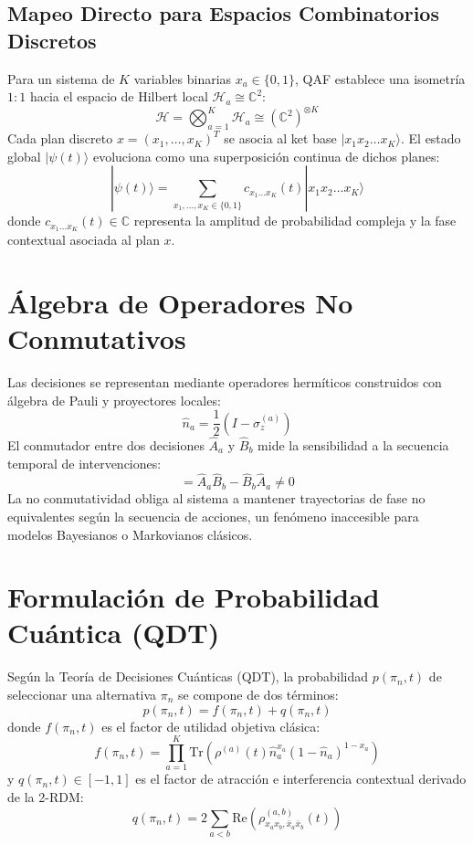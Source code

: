 \documentclass[11pt,a4paper,oneside]{report}
\begin{document}
\subsection{Mapeo Directo para Espacios Combinatorios Discretos}
Para un sistema de $K$ variables binarias $x_a \in \{0, 1\}$, QAF establece una isometría $1:1$ hacia el espacio de Hilbert local $\mathcal{H}_a \cong \mathbb{C}^2$:
\begin{equation}
\mathcal{H} = \bigotimes_{a=1}^K \mathcal{H}_a \cong (\mathbb{C}^2)^{\otimes K}
\end{equation}
Cada plan discreto $x = (x_1, \dots, x_K)^T$ se asocia al ket base $|x_1 x_2 \dots x_K\rangle$. El estado global $|\psi(t)\rangle$ evoluciona como una superposición continua de dichos planes:
\begin{equation}
|\psi(t)\rangle = \sum_{x_1, \dots, x_K \in \{0,1\}} c_{x_1 \dots x_K}(t) |x_1 x_2 \dots x_K\rangle
\end{equation}
donde $c_{x_1 \dots x_K}(t) \in \mathbb{C}$ representa la amplitud de probabilidad compleja y la fase contextual asociada al plan $x$.

\section{Álgebra de Operadores No Conmutativos}
Las decisiones se representan mediante operadores hermíticos construidos con álgebra de Pauli y proyectores locales:
\begin{equation}
\hat{n}_a = \frac{1}{2}(I - \sigma_z^{(a)})
\end{equation}
El conmutador entre dos decisiones $\hat{A}_a$ y $\hat{B}_b$ mide la sensibilidad a la secuencia temporal de intervenciones:
\begin{equation}
[\hat{A}_a, \hat{B}_b] = \hat{A}_a \hat{B}_b - \hat{B}_b \hat{A}_a \neq 0
\end{equation}
La no conmutatividad obliga al sistema a mantener trayectorias de fase no equivalentes según la secuencia de acciones, un fenómeno inaccesible para modelos Bayesianos o Markovianos clásicos.

\section{Formulación de Probabilidad Cuántica (QDT)}
Según la Teoría de Decisiones Cuánticas (QDT), la probabilidad $p(\pi_n, t)$ de seleccionar una alternativa $\pi_n$ se compone de dos términos:
\begin{equation}
p(\pi_n, t) = f(\pi_n, t) + q(\pi_n, t)
\end{equation}
donde $f(\pi_n, t)$ es el factor de utilidad objetiva clásica:
\begin{equation}
f(\pi_n, t) = \prod_{a=1}^K \text{Tr}\left( \rho^{(a)}(t) \hat{n}_a^{x_a} (1 - \hat{n}_a)^{1-x_a} \right)
\end{equation}
y $q(\pi_n, t) \in [-1, 1]$ es el factor de atracción e interferencia contextual derivado de la 2-RDM:
\begin{equation}
q(\pi_n, t) = 2 \sum_{a<b} \text{Re}\left( \rho^{(a,b)}_{x_a x_b, \bar{x}_a \bar{x}_b}(t) \right)
\end{equation}
\end{document}
